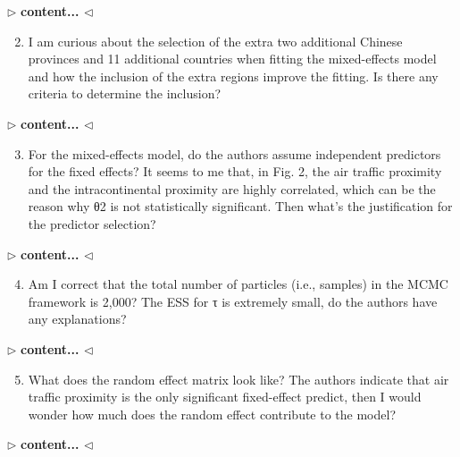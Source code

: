 \documentclass[12pt]{article}
\newenvironment{reply}{$\triangleright$\bfseries}{$\triangleleft$}
\begin{document}
\begin{reply}
	content...
\end{reply}

\begin{enumerate}	
	  \setcounter{enumi}{1}
	\item I am curious about the selection of the extra two additional Chinese provinces and 11 additional countries when fitting the mixed-effects model and how the inclusion of the extra regions improve the fitting. Is there any criteria to determine the inclusion?
\end{enumerate}

\begin{reply}
content...
\end{reply}

\begin{enumerate}	
\setcounter{enumi}{2}
	
	\item For the mixed-effects model, do the authors assume independent predictors for the fixed effects? It seems to me that, in Fig. 2, the air traffic proximity and the intracontinental proximity are highly correlated, which can be the reason why θ2 is not statistically significant. Then what’s the justification for the predictor selection?
\end{enumerate}

\begin{reply}
content...
\end{reply}

\begin{enumerate}	
\setcounter{enumi}{3}	
	\item Am I correct that the total number of particles (i.e., samples) in the MCMC framework is 2,000? The ESS for τ is extremely small, do the authors have any explanations?
\end{enumerate}

\begin{reply}
content...
\end{reply}

\begin{enumerate}	
\setcounter{enumi}{4}	
	\item What does the random effect matrix look like? The authors indicate that air traffic proximity is the only significant fixed-effect predict, then I would wonder how much does the random effect contribute to the model?
\end{enumerate}

\begin{reply}
content...
\end{reply}
\end{document}
